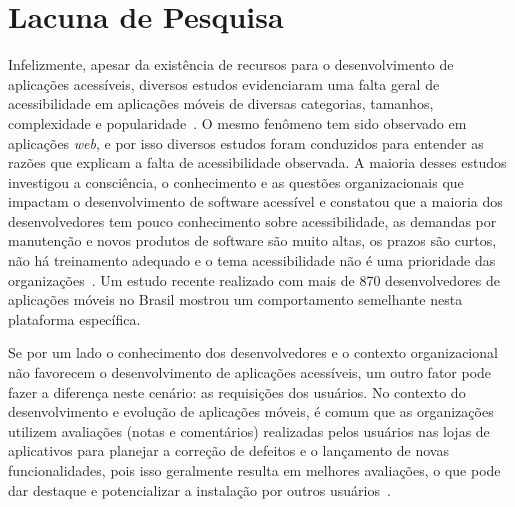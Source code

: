 


\section{Lacuna de Pesquisa}

Infelizmente, 
apesar da existência de recursos para o desenvolvimento de aplicações acessíveis, 
diversos estudos evidenciaram uma falta geral de acessibilidade em aplicações móveis de diversas categorias, tamanhos, complexidade e popularidade~\cite{serra2015accessibility,eler2018mate,Yan2019currentstatus,Vendome2019,Alshayban2020,AcostaVargas2020}.
O mesmo fenômeno tem sido observado em aplicações \textit{web}, e por isso diversos estudos foram conduzidos para entender as razões que explicam a falta de acessibilidade observada. A maioria desses estudos investigou a consciência, o conhecimento e as questões organizacionais que impactam o desenvolvimento de software acessível e constatou que a maioria dos desenvolvedores tem pouco conhecimento sobre acessibilidade, as demandas por manutenção e novos produtos de software são muito altas, os prazos são curtos, não há treinamento adequado e o tema acessibilidade não é uma prioridade das organizações~\cite{  
lazar2004improving,Freire2008survey,oliveira2017strategies,Inal2019,barzilai2008factors,Putnam:2012}. Um estudo recente realizado com mais de 870 desenvolvedores de aplicações móveis no Brasil mostrou um comportamento semelhante nesta plataforma específica.


Se por um lado o conhecimento dos desenvolvedores e o contexto organizacional não favorecem o desenvolvimento de aplicações acessíveis, um outro fator pode fazer a diferença neste cenário: as requisições dos usuários. 
No contexto do desenvolvimento e evolução de aplicações móveis, 
é comum que as organizações utilizem avaliações (notas e comentários) realizadas pelos usuários nas lojas de aplicativos para planejar a correção de defeitos e o lançamento de novas funcionalidades, pois isso geralmente resulta em melhores avaliações, o que pode dar destaque e potencializar a instalação por outros usuários~\cite{nayebi,Palomba2015userreviews,Palomba2018crowdsourcing,Li2018MobileAE,Ciurumelea2017analyzing,Ortega2015thesis}.

